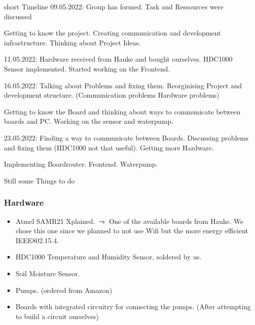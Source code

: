 \documentclass[10pt, xcolor=svgnames]{beamer}
\begin{document}
\begin{frame}{short Timeline}
    09.05.2022: Group has formed. Task and Ressources were discussed

    \vspace*{0.25cm}
    
    Getting to know the project. Creating communication and development infrastructure. Thinking about Project Ideas.
    
    \vspace*{0.25cm}

    11.05.2022: Hardware received from Hauke and bought ourselves. HDC1000 Sensor implemented. Started working on the Frontend.
    
    \vspace*{0.25cm}
    
    16.05.2022: Talking about Problems and fixing them. Reorginising Project and development structure. (Communication problems Hardware problems)

    \vspace*{0.25cm}

    Getting to know the Board and thinking about ways to communicate between boards and PC. Working on the sensor and waterpump.

    \vspace*{0.25cm}
    
    23.05.2022: Finding a way to communicate between Boards. Discussing problems and fixing them (HDC1000 not that useful). Getting more Hardware.
    
    \vspace*{0.25cm}
    Implementing Boardrouter. Frontend. Waterpump.
    
    Still some Things to do
    
    
\end{frame}

\begin{frame}
    \frametitle{Hardware}

    \begin{itemize}
        \item Atmel SAMR21 Xplained. \(\leadsto\) One of the available boards from Hauke. We chose this one since we planned to not use Wifi but the more energy efficient IEEE802.15.4.
        \item HDC1000 Temperature and Humidity Sensor, soldered by us.
        \item Soil Moisture Sensor.
        \item Pumps. (ordered from Amazon)
        \item Boards with integrated circuitry for connecting the pumps. (After attempting to build a circuit ourselves)
    \end{itemize}
\end{frame}
\end{document}
